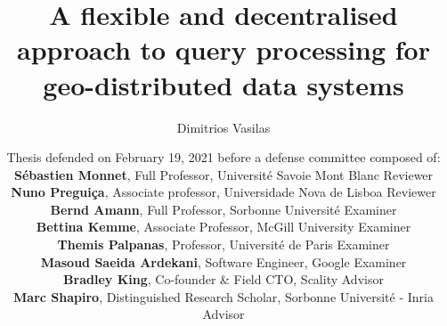 \documentclass[aspectratio=169]{beamer}
\title{A flexible and decentralised approach to query processing for geo-distributed data systems}
\author{\normalsize Dimitrios Vasilas}
\date{\scriptsize{Thesis defended on February 19, 2021 before a defense committee composed of: \\ \medskip
\textbf{S{\'e}bastien Monnet}, Full Professor, Universit{\'e} Savoie Mont Blanc \hfill Reviewer \\
\textbf{Nuno Pregui\c{c}a}, Associate professor, Universidade Nova de Lisboa \hfill Reviewer \\
\textbf{Bernd Amann}, Full Professor, Sorbonne Universit{\'e}  \hfill Examiner \\
\textbf{Bettina Kemme}, Associate Professor, McGill University \hfill Examiner \\
\textbf{Themis Palpanas}, Professor, Universit\'{e} de Paris \hfill Examiner \\
\textbf{Masoud Saeida Ardekani}, Software Engineer, Google \hfill Examiner \\
\textbf{Bradley King}, Co-founder \& Field CTO, Scality \hfill Advisor \\
\textbf{Marc Shapiro}, Distinguished Research Scholar, Sorbonne Universit{\'e} - Inria \hfill Advisor \\
}
}
\begin{document}
\begin{frame}[plain]
\vspace{-1cm}
\titlepage
\end{frame}




\end{document}
